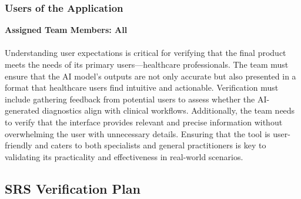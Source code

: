 \documentclass[12pt, titlepage]{article}
\begin{document}
\subsubsection{Users of the Application}
\textbf{Assigned Team Members: All} \\\\
Understanding user expectations is critical for verifying that the final product meets the needs of its primary users—healthcare professionals. The team must ensure that the AI model's outputs are not only accurate but also presented in a format that healthcare users find intuitive and actionable. Verification must include gathering feedback from potential users to assess whether the AI-generated diagnostics align with clinical workflows. Additionally, the team needs to verify that the interface provides relevant and precise information without overwhelming the user with unnecessary details. Ensuring that the tool is user-friendly and caters to both specialists and general practitioners is key to validating its practicality and effectiveness in real-world scenarios.


\subsection{SRS Verification Plan}
\end{document}

